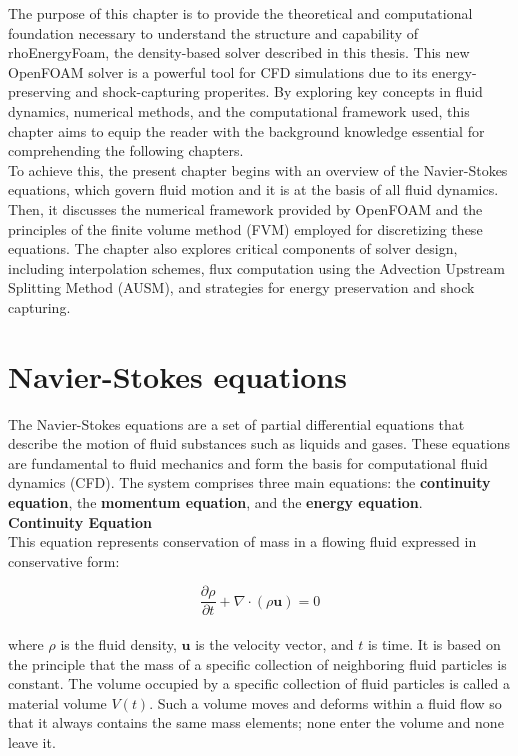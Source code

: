 \documentclass[a5paper]{sapthesis}
\begin{document}
	The purpose of this chapter is to provide the theoretical and computational foundation necessary to understand the structure and capability of rhoEnergyFoam, the density-based solver described in this thesis. This new OpenFOAM solver is a powerful tool for CFD simulations due to its energy-preserving and shock-capturing properites. By exploring key concepts in fluid dynamics, numerical methods, and the computational framework used, this chapter aims to equip the reader with the background knowledge essential for comprehending the following chapters.
	\\
	To achieve this, the present chapter begins with an overview of the Navier-Stokes equations, which govern fluid motion and it is at the basis of all fluid dynamics. Then, it discusses the numerical framework provided by OpenFOAM and the principles of the finite volume method (FVM) employed for discretizing these equations. The chapter also explores critical components of solver design, including interpolation schemes, flux computation using the Advection Upstream Splitting Method (AUSM), and strategies for energy preservation and shock capturing.	
	
	\section{Navier-Stokes equations}
	
	The Navier-Stokes equations are a set of partial differential equations that describe the motion of fluid substances such as liquids and gases. These equations are fundamental to fluid mechanics and form the basis for computational fluid dynamics (CFD). The system comprises three main equations: the \textbf{continuity equation}, the \textbf{momentum equation}, and the \textbf{energy equation}.\\
	
	\noindent \textbf{Continuity Equation}\\
	This equation represents conservation of mass in a flowing fluid expressed in conservative form:
	
	\begin{equation}
		\dfrac{\partial \rho}{\partial t} + \nabla \cdot (\rho \mathbf{u}) = 0
		\label{continuity}
	\end{equation}
	\\
	where $\rho$ is the fluid density, $\mathbf{u}$ is the velocity vector, and $t$ is time.
	It is based on the principle that the mass of a specific collection of neighboring fluid particles is constant. The volume occupied by a specific collection of fluid particles is called a material volume $V(t)$. Such a volume moves and deforms within a fluid flow so that it always contains the same mass elements; none enter the volume and none leave it.\\
	
\end{document}
